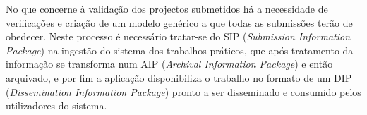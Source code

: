 No que concerne à validação dos projectos submetidos há a necessidade de verificações e 
criação de um modelo genérico a que todas as submissões terão de obedecer. Neste processo
é necessário tratar-se do SIP (\textit{Submission Information Package}) na ingestão do sistema dos
trabalhos práticos, que após tratamento da informação se transforma num AIP (\textit{Archival 
Information Package}) e então arquivado, e por fim a aplicação disponibiliza o trabalho no formato
de um DIP (\textit{Dissemination Information Package}) pronto a ser disseminado e consumido pelos
utilizadores do sistema.
